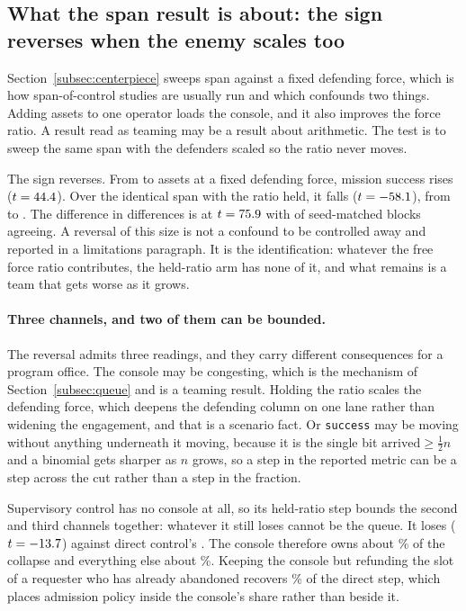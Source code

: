 \documentclass[11pt]{article}
\begin{document}
\subsection{What the span result is about: the sign reverses when the enemy scales too}
\label{subsec:attrib}

Section~\ref{subsec:centerpiece} sweeps span against a fixed defending force, which is how span-of-control studies are usually run and which confounds two things. Adding assets to one operator loads the console, and it also improves the force ratio. A result read as teaming may be a result about arithmetic. The test is to sweep the same span with the defenders scaled so the ratio never moves.

The sign reverses. From \atSpanLo{} to \atSpanHi{} assets at a fixed defending force, mission success rises \atFixDir{} ($t = 44.4$). Over the identical span with the ratio held, it falls \atHeldDir{} ($t = -58.1$), from \atDirLo{} to \atDirHi{}. The difference in differences is \atDid{} at $t = 75.9$ with \atDidBlocks{} of \atDidN{} seed-matched blocks agreeing. A reversal of this size is not a confound to be controlled away and reported in a limitations paragraph. It is the identification: whatever the free force ratio contributes, the held-ratio arm has none of it, and what remains is a team that gets worse as it grows.

\paragraph{Three channels, and two of them can be bounded.} The reversal admits three readings, and they carry different consequences for a program office. The console may be congesting, which is the mechanism of Section~\ref{subsec:queue} and is a teaming result. Holding the ratio scales the defending force, which deepens the defending column on one lane rather than widening the engagement, and that is a scenario fact. Or \texttt{success} may be moving without anything underneath it moving, because it is the single bit $\text{arrived} \geq \tfrac{1}{2}n$ and a binomial gets sharper as $n$ grows, so a step in the reported metric can be a step across the cut rather than a step in the fraction.

Supervisory control has no console at all, so its held-ratio step bounds the second and third channels together: whatever it still loses cannot be the queue. It loses \atHeldSup{} ($t = -13.7$) against direct control's \atHeldDir{}. The console therefore owns about \atConsoleShare\% of the collapse and everything else about \atScenarioShare\%. Keeping the console but refunding the slot of a requester who has already abandoned recovers \atRefundShare\% of the direct step, which places admission policy inside the console's share rather than beside it.
\end{document}
